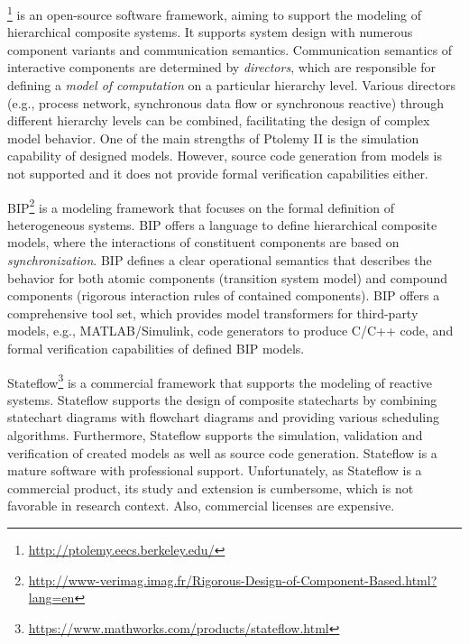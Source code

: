 \ptolemy\footnote{\url{http://ptolemy.eecs.berkeley.edu/}} \cite{ptolemy,ptolemy2} is an open-source software framework, aiming to support
the modeling of hierarchical composite systems. It supports system design with numerous component variants and communication semantics. Communication semantics of interactive components are determined by \emph{directors}, which are responsible for defining a \emph{model of computation} on a particular hierarchy level. Various directors (e.g., process network, synchronous data flow
or synchronous reactive) through different hierarchy levels can be combined, facilitating the design of complex model behavior. One of the main strengths of Ptolemy II is the simulation capability of designed models. However, source code generation from models is not supported and it does not provide formal verification capabilities either.

BIP\footnote{\url{http://www-verimag.imag.fr/Rigorous-Design-of-Component-Based.html?lang=en}} \cite{bip,bip3} is a modeling framework that focuses on the formal definition of heterogeneous systems.
BIP offers a language to define hierarchical composite models, where the interactions of constituent components are based on \emph{synchronization}. BIP defines a clear operational semantics that describes the behavior for both atomic components (transition system model) and compound components (rigorous interaction rules of contained components). BIP offers a comprehensive tool set, which provides model transformers for third-party models, e.g., MATLAB/Simulink, code generators to produce C/C++ code, and formal
verification capabilities of defined BIP models.

Stateflow\footnote{\url{https://www.mathworks.com/products/stateflow.html}} \cite{stateflow} is a commercial framework that supports the modeling of
reactive systems. Stateflow supports the design of composite
statecharts by combining
statechart diagrams with flowchart diagrams and providing various scheduling
algorithms. Furthermore, Stateflow supports the simulation, validation and verification of created models as well as source code generation. Stateflow is a mature software with professional
support. Unfortunately, as Stateflow is a commercial product, its study and extension is cumbersome, which is not favorable in research context. Also, commercial licenses are expensive.


